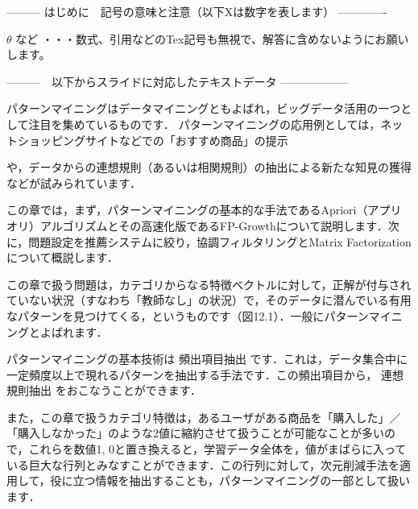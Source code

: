 --------- はじめに　記号の意味と注意（以下Xは数字を表します） -------------

$\theta$ など       ・・・数式、引用などのTex記号も無視で、解答に含めないようにお願いします。
\cite{mitchell97}

---------　以下からスライドに対応したテキストデータ ------------------



パターンマイニングはデータマイニングともよばれ，ビッグデータ活用の一つとして注目を集めているものです．
パターンマイニングの応用例としては，ネットショッピングサイトなどでの「おすすめ商品」の提示

や，データからの連想規則（あるいは相関規則）の抽出による新たな知見の獲得などが試みられています．

この章では，まず，パターンマイニングの基本的な手法であるApriori（アプリオリ）アルゴリズムとその高速化版であるFP-Growthについて説明します．次に，問題設定を推薦システムに絞り，協調フィルタリングとMatrix Factorizationについて概説します．


この章で扱う問題は，カテゴリからなる特徴ベクトルに対して，正解が付与されていない状況（すなわち「教師なし」の状況）で，そのデータに潜んでいる有用なパターンを見つけてくる，というものです（図12.1）．一般にパターンマイニングとよばれます．


パターンマイニングの基本技術は
頻出項目抽出
です．これは，データ集合中に一定頻度以上で現れるパターンを抽出する手法です．この頻出項目から，
連想規則抽出
をおこなうことができます．


また，この章で扱うカテゴリ特徴は，あるユーザがある商品を「購入した」／「購入しなかった」のような2値に縮約させて扱うことが可能なことが多いので，これらを数値1, 0と置き換えると，学習データ全体を，値がまばらに入っている巨大な行列とみなすことができます．この行列に対して，次元削減手法を適用して，役に立つ情報を抽出することも，パターンマイニングの一部として扱います．


